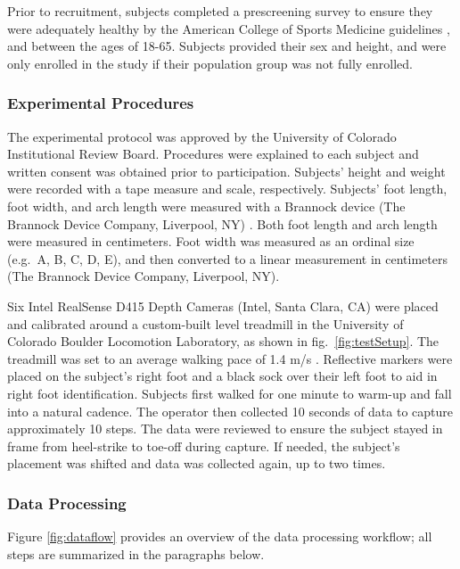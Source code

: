 \documentclass[defaultstyle,11pt]{comps}
\begin{document}
Prior to recruitment, subjects completed a prescreening survey to ensure they were adequately healthy by the American College of Sports Medicine guidelines \citep{Riebe2015}, and between the ages of 18-65.
Subjects provided their sex and height, and were only enrolled in the study if their population group was not fully enrolled.

\hypertarget{experimental-procedures}{%
\subsubsection{Experimental Procedures}\label{experimental-procedures}}

The experimental protocol was approved by the University of Colorado Institutional Review Board.
Procedures were explained to each subject and written consent was obtained prior to participation.
Subjects' height and weight were recorded with a tape measure and scale, respectively.
Subjects' foot length, foot width, and arch length were measured with a Brannock device (The Brannock Device Company, Liverpool, NY) \citep{ASTM2017}.
Both foot length and arch length were measured in centimeters.
Foot width was measured as an ordinal size (e.g.~A, B, C, D, E), and then converted to a linear measurement in centimeters (The Brannock Device Company, Liverpool, NY).

Six Intel RealSense D415 Depth Cameras (Intel, Santa Clara, CA) were placed and calibrated around a custom-built level treadmill in the University of Colorado Boulder Locomotion Laboratory, as shown in fig.~\ref{fig:testSetup}.
The treadmill was set to an average walking pace of 1.4 m/s \citep{Browning2006}.
Reflective markers were placed on the subject's right foot and a black sock over their left foot to aid in right foot identification.
Subjects first walked for one minute to warm-up and fall into a natural cadence.
The operator then collected 10 seconds of data to capture approximately 10 steps.
The data were reviewed to ensure the subject stayed in frame from heel-strike to toe-off during capture. If needed, the subject's placement was shifted and data was collected again, up to two times.

\hypertarget{data-processing}{%
\subsubsection{Data Processing}\label{data-processing}}

Figure \ref{fig:dataflow} provides an overview of the data processing workflow; all steps are summarized in the paragraphs below.
\end{document}
